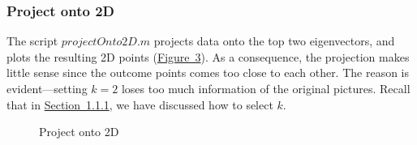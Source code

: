 \documentclass{article}
\begin{document}
\subsubsection{Project onto 2D}
The script $projectOnto2D.m$ projects data onto the top two eigenvectors, and plots the resulting 2D points (\hyperref[fig-3]{Figure~3}). As a consequence, the projection makes little sense since the outcome points comes too close to each other. The reason is evident---setting $k=2$ loses too much information of the original pictures. Recall that in \hyperref[sec-1.1.1]{Section~1.1.1}, we have discussed how to select $k$.
\begin{figure}
	\centering
	\quad
	\caption{Project onto 2D}
	\label{fig-3}
\end{figure}
\end{document}
